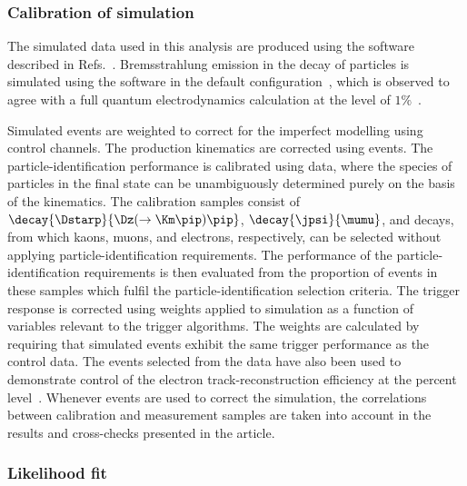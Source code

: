 \subsubsection*{Calibration of simulation} 

The simulated data used in this analysis are produced using the software described in Refs.~\cite{Sjostrand:2006za,*Sjostrand:2007gs,LHCb-PROC-2010-056,Lange:2001uf,Allison:2006ve, *Agostinelli:2002hh,LHCb-PROC-2011-006}. Bremsstrahlung emission in the decay of particles is simulated using the \photosplusplus software in the default configuration~\cite{ Davidson:2010ew}, which is observed to agree with a full quantum electrodynamics calculation at the level of $1\%$~\cite{Bordone:2016gaq}.

Simulated events are weighted to correct for the imperfect modelling using control channels. The \Bu production kinematics are corrected using \BuJpsiKll events. The particle-identification performance is calibrated using data, where the species of particles in the final state can be unambiguously determined purely on the basis of the kinematics. 
The calibration samples consist of $\decay{\Dstarp}{\Dz(\to\Km\pip)\pip}$, $\decay{\jpsi}{\mumu}$, and \BuJpsiKee decays, from which kaons, muons, and electrons, respectively, can be selected without applying particle-identification requirements. The performance of the particle-identification requirements is then evaluated from the proportion of events in these samples which fulfil the particle-identification selection criteria. The trigger response is corrected using weights applied to simulation as a function of variables relevant to the trigger algorithms. The weights are calculated by requiring that simulated \BuJpsiKll events  exhibit the same trigger performance as the control data. The \BuJpsiKll events selected from the data have also been used to demonstrate control of the electron track-reconstruction efficiency at the percent level~\cite{Aaij:2019vvl}.
Whenever \BuJpsiKll events are used to correct the simulation, the correlations between calibration and measurement samples are taken into account in the results and cross-checks presented in the article. 

\subsubsection*{Likelihood fit} 

